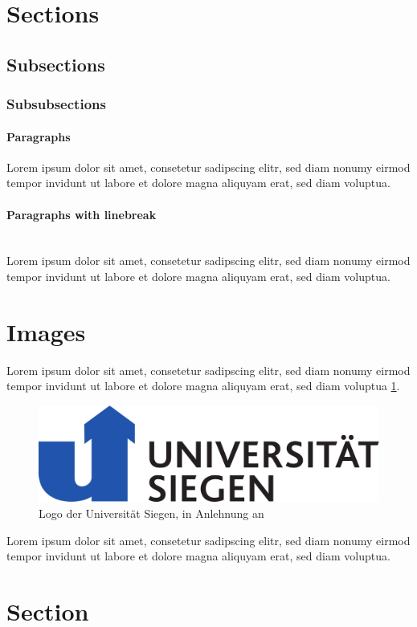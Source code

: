 \documentclass[
        ngerman,
        paper=a4,
        numbers=noendperiod,
]{scrreprt}
\begin{document}
\section{Sections}
\subsection{Subsections}
\subsubsection{Subsubsections}
\paragraph{Paragraphs}
Lorem ipsum dolor sit amet, consetetur sadipscing elitr, sed diam nonumy eirmod tempor invidunt ut labore et dolore magna aliquyam erat, sed diam voluptua. 
\paragraph{Paragraphs with linebreak}$\;$\\
Lorem ipsum dolor sit amet, consetetur sadipscing elitr, sed diam nonumy eirmod tempor invidunt ut labore et dolore magna aliquyam erat, sed diam voluptua. 
\section{Images}
Lorem ipsum dolor sit amet, consetetur sadipscing elitr, sed diam nonumy eirmod tempor invidunt ut labore et dolore magna aliquyam erat, sed diam voluptua \ref{fig:uni_siegen}. 
\begin{figure}[H]
    \centering\includegraphics[width=0.50\linewidth]{images/logo_uni_siegen_4c_[konvertiert].pdf}
    \caption[Logo der Universität Siegen]{Logo der Universität Siegen, in Anlehnung an \cite []{eff70}}
    \label{fig:uni_siegen}
\end{figure}
Lorem ipsum dolor sit amet, consetetur sadipscing elitr, sed diam nonumy eirmod tempor invidunt ut labore et dolore magna aliquyam erat, sed diam voluptua.
\section{Section}
\end{document}

